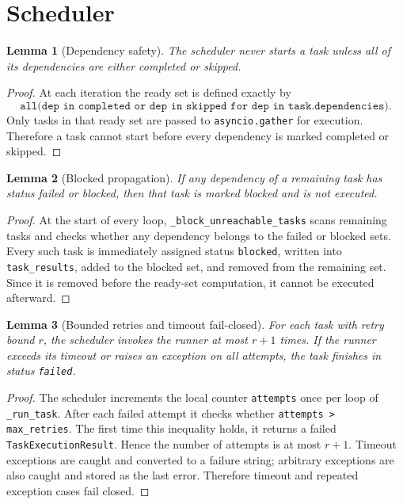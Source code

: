 \documentclass[11pt]{article}
\newtheorem{lemma}{Lemma}
\theoremstyle{definition}
\begin{document}
\section{Scheduler}
\begin{lemma}[Dependency safety]
The scheduler never starts a task unless all of its dependencies are either completed or skipped.
\end{lemma}

\begin{proof}
At each iteration the ready set is defined exactly by
\[
\texttt{all(dep in completed or dep in skipped for dep in task.dependencies)}.
\]
Only tasks in that ready set are passed to \texttt{asyncio.gather} for execution. Therefore a
task cannot start before every dependency is marked completed or skipped.
\end{proof}

\begin{lemma}[Blocked propagation]
If any dependency of a remaining task has status failed or blocked, then that task is marked
blocked and is not executed.
\end{lemma}

\begin{proof}
At the start of every loop, \texttt{\_block\_unreachable\_tasks} scans remaining tasks and checks
whether any dependency belongs to the failed or blocked sets. Every such task is immediately
assigned status \texttt{blocked}, written into \texttt{task\_results}, added to the blocked set,
and removed from the remaining set. Since it is removed before the ready-set computation, it
cannot be executed afterward.
\end{proof}

\begin{lemma}[Bounded retries and timeout fail-closed]
For each task with retry bound \(r\), the scheduler invokes the runner at most \(r+1\) times.
If the runner exceeds its timeout or raises an exception on all attempts, the task finishes in
status \texttt{failed}.
\end{lemma}

\begin{proof}
The scheduler increments the local counter \texttt{attempts} once per loop of
\texttt{\_run\_task}. After each failed attempt it checks whether \texttt{attempts > max\_retries}.
The first time this inequality holds, it returns a failed \texttt{TaskExecutionResult}. Hence
the number of attempts is at most \(r+1\). Timeout exceptions are caught and converted to a
failure string; arbitrary exceptions are also caught and stored as the last error. Therefore
timeout and repeated exception cases fail closed.
\end{proof}
\end{document}
